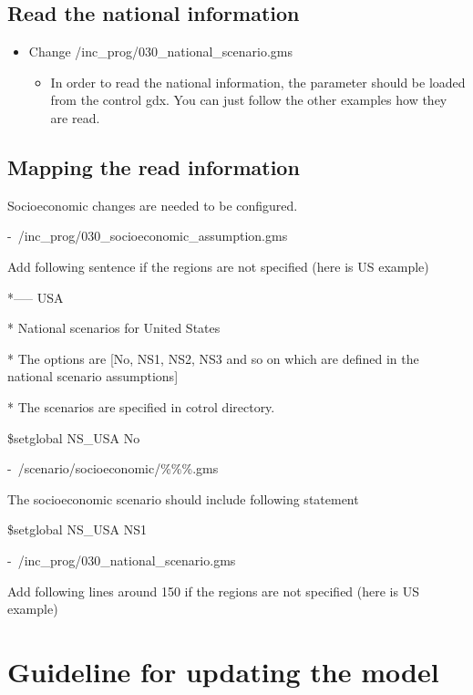 \documentclass[10pt,a4paper,titlepage,dvipdfmx]{book}
\begin{document}
\section{\label{sec:ReaNatInf}Read the national information}


\begin{itemize}
\item Change /inc\_prog/030\_national\_scenario.gms
\begin{itemize}
\item In order to read the national information, the parameter should be loaded from the control gdx. You can just follow the other examples how they are read.
\end{itemize}

\end{itemize}
\section{\label{sec:MpReaInf}Mapping the read information}

Socioeconomic changes are needed to be configured.

-~/inc\_prog/030\_socioeconomic\_assumption.gms

Add following sentence if the regions are not specified (here is US example)

*----- USA

* National scenarios for United States

* The options are [No, NS1, NS2, NS3 and so on which are defined in the national scenario assumptions]

* The scenarios are specified in cotrol directory.

\$setglobal NS\_USA No

-~/scenario/socioeconomic/\%\%\%.gms

The socioeconomic scenario should include following statement

\$setglobal NS\_USA NS1

-~/inc\_prog/030\_national\_scenario.gms

Add following lines around 150 if the regions are not specified (here is US example)


\chapter{\label{chp:GuiChaMod}Guideline for updating the model}
\end{document}
